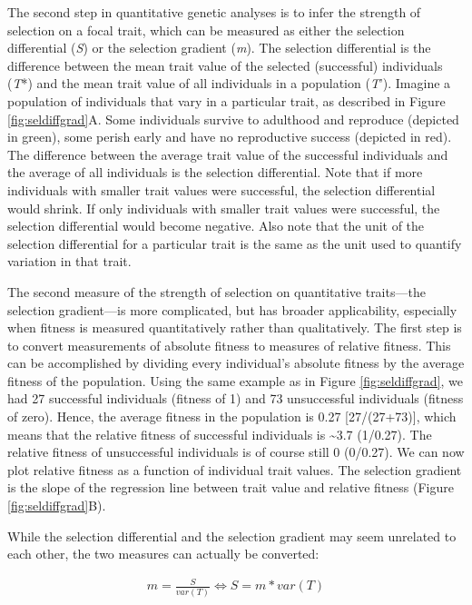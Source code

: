 \documentclass[
]{book}
\begin{document}
The second step in quantitative genetic analyses is to infer the strength of selection on a focal trait, which can be measured as either the selection differential (\emph{S}) or the selection gradient (\emph{m}). The selection differential is the difference between the mean trait value of the selected (successful) individuals (\emph{T}*) and the mean trait value of all individuals in a population (\emph{T}'). Imagine a population of individuals that vary in a particular trait, as described in Figure \ref{fig:seldiffgrad}A. Some individuals survive to adulthood and reproduce (depicted in green), some perish early and have no reproductive success (depicted in red). The difference between the average trait value of the successful individuals and the average of all individuals is the selection differential. Note that if more individuals with smaller trait values were successful, the selection differential would shrink. If only individuals with smaller trait values were successful, the selection differential would become negative. Also note that the unit of the selection differential for a particular trait is the same as the unit used to quantify variation in that trait.

The second measure of the strength of selection on quantitative traits---the selection gradient---is more complicated, but has broader applicability, especially when fitness is measured quantitatively rather than qualitatively. The first step is to convert measurements of absolute fitness to measures of relative fitness. This can be accomplished by dividing every individual's absolute fitness by the average fitness of the population. Using the same example as in Figure \ref{fig:seldiffgrad}, we had 27 successful individuals (fitness of 1) and 73 unsuccessful individuals (fitness of zero). Hence, the average fitness in the population is 0.27 {[}27/(27+73){]}, which means that the relative fitness of successful individuals is \textasciitilde3.7 (1/0.27). The relative fitness of unsuccessful individuals is of course still 0 (0/0.27). We can now plot relative fitness as a function of individual trait values. The selection gradient is the slope of the regression line between trait value and relative fitness (Figure \ref{fig:seldiffgrad}B).

While the selection differential and the selection gradient may seem unrelated to each other, the two measures can actually be converted:

\begin{align} 
m=\frac{S}{var(T)} \iff S=m*var(T) \label{eq:41}
\end{align}
\end{document}
